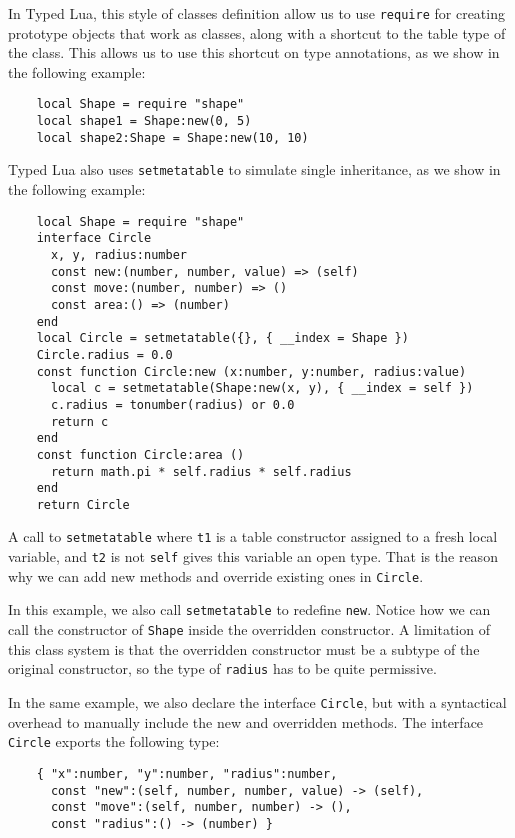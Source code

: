 In Typed Lua, this style of classes definition allow us to use \texttt{require}
for creating prototype objects that work as classes,
along with a shortcut to the table type of the class.
This allows us to use this shortcut on type annotations,
as we show in the following example:
\begin{verbatim}
    local Shape = require "shape"
    local shape1 = Shape:new(0, 5)
    local shape2:Shape = Shape:new(10, 10)
\end{verbatim}

Typed Lua also uses \texttt{setmetatable} to simulate single inheritance,
as we show in the following example:

\begin{verbatim}
    local Shape = require "shape"
    interface Circle
      x, y, radius:number
      const new:(number, number, value) => (self)
      const move:(number, number) => ()
      const area:() => (number)
    end
    local Circle = setmetatable({}, { __index = Shape })
    Circle.radius = 0.0
    const function Circle:new (x:number, y:number, radius:value)
      local c = setmetatable(Shape:new(x, y), { __index = self })
      c.radius = tonumber(radius) or 0.0
      return c
    end
    const function Circle:area ()
      return math.pi * self.radius * self.radius
    end
    return Circle
\end{verbatim}

A call to \texttt{setmetatable} where \texttt{t1} is a table
constructor assigned to a fresh local variable, and \texttt{t2}
is not \texttt{self} gives this variable an open type.
That is the reason why we can add new methods and override
existing ones in \texttt{Circle}.

In this example, we also call \texttt{setmetatable} to redefine \texttt{new}.
Notice how we can call the constructor of \texttt{Shape} inside
the overridden constructor.
A limitation of this class system is that the overridden constructor
must be a subtype of the original constructor,
so the type of \texttt{radius} has to be quite permissive.

In the same example, we also declare the interface \texttt{Circle},
but with a syntactical overhead to manually include the new and
overridden methods.
The interface \texttt{Circle} exports the following type:
\begin{verbatim}
    { "x":number, "y":number, "radius":number,
      const "new":(self, number, number, value) -> (self),
      const "move":(self, number, number) -> (),
      const "radius":() -> (number) }
\end{verbatim}

